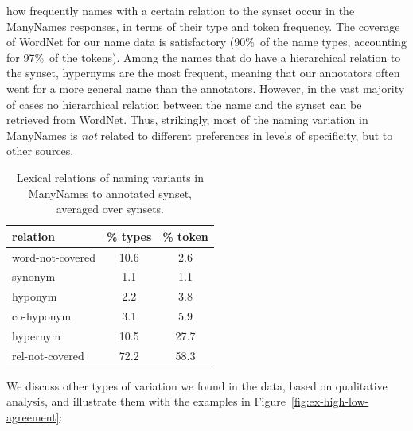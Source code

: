 how frequently names with a certain relation to the synset occur in the ManyNames responses, in terms of their  type and token frequency. 
The coverage of WordNet for our name data is satisfactory (90\%\ of the name types, accounting for 97\%\ of the tokens).
Among the names that do have a hierarchical relation to the synset, hypernyms are the most frequent, meaning that our annotators often went for a more general name than the \vg annotators.
However, in the vast majority of cases no hierarchical relation between the name and the synset can be retrieved from WordNet.
Thus, strikingly, most of the naming variation in ManyNames is \textit{not} related to different preferences in levels of specificity, %
 but to other sources.

\begin{table}
\small
\centering
\begin{tabular}{lcc}
\toprule
         relation & \% types & \% token \\
\midrule
 word-not-covered &  10.6 &  2.6 \\
\midrule
 synonym &  1.1 &  1.1 \\
 hyponym &  2.2 &  3.8 \\
 co-hyponym &  3.1 &  5.9 \\
 hypernym &  10.5 &  27.7 \\
 rel-not-covered &  72.2 &  58.3 \\
\bottomrule
\end{tabular}
\caption{Lexical relations of naming variants in ManyNames to annotated \vg synset, averaged over synsets.}
\label{tab:rel}
\end{table}

We discuss other types of variation we found in the data, based on qualitative analysis, and illustrate them with the examples in Figure\ \ref{fig:ex-high-low-agreement}:

